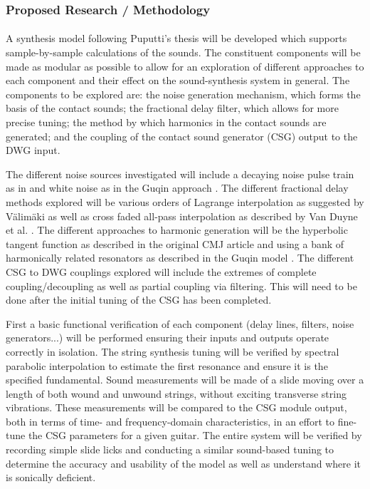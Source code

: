 \documentclass[12pt]{article}
\begin{document}
\subsubsection*{Proposed Research / Methodology}
\paragraph{}
A synthesis model following Puputti's thesis will be developed which supports sample-by-sample calculations of the sounds. The constituent components will be made as modular as possible to allow for an exploration of different approaches to each component and their effect on the sound-synthesis system in general. The components to be explored are: the noise generation mechanism, which forms the basis of the contact sounds; the fractional delay filter, which allows for more precise tuning; the method by which harmonics in the contact sounds are generated; and the coupling of the contact sound generator (CSG) output to the DWG input.

The different noise sources investigated will include a decaying noise pulse train as in \cite{pakarinen_virtual_2008} and white noise as in the Guqin approach \cite{penttinen_model-based_2006}. The different fractional delay methods explored will be various orders of Lagrange interpolation as suggested by Välimäki \cite{valimaki_discrete-time_1995} as well as cross faded all-pass interpolation as described by Van Duyne et al. \cite{duyne_lossless_1997}. The different approaches to harmonic generation will be the hyperbolic tangent function as described in the original CMJ article \cite{pakarinen_virtual_2008} and using a bank of harmonically related resonators as described in the Guqin model \cite{penttinen_model-based_2006}. The different CSG to DWG couplings explored will include the extremes of complete coupling/decoupling as well as partial coupling via filtering. This will need to be done after the initial tuning of the CSG has been completed.

First a basic functional verification of each component (delay lines, filters, noise generators...) will be performed ensuring their inputs and outputs operate correctly in isolation. The string synthesis tuning will be verified by spectral parabolic interpolation to estimate the first resonance and ensure it is the specified fundamental. Sound measurements will be made of a slide moving over a length of both wound and unwound strings, without exciting transverse string vibrations. These measurements will be compared to the CSG module output, both in terms of time- and frequency-domain characteristics, in an effort to fine-tune the CSG parameters for a given guitar. The entire system will be verified by recording simple slide licks and conducting a similar sound-based tuning to determine the accuracy and usability of the model as well as understand where it is sonically deficient.
\end{document}
